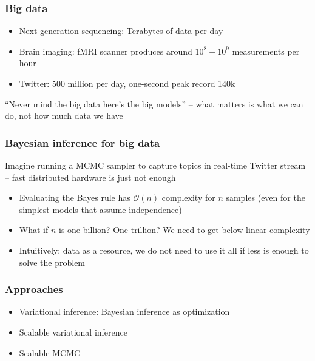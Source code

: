 \documentclass{beamer}
\begin{document}
\begin{frame}
  \frametitle{Big data}

  \begin{itemize}
    \item Next generation sequencing: Terabytes of data per day
    \item Brain imaging: fMRI scanner produces around $10^8-10^9$
      measurements per hour
    \item Twitter: 500 million per day, one-second peak record 140k
  \end{itemize}

  ``Never mind the big data here's the big models'' -- what matters
  is what we can do, not how much data we have

\end{frame}

\begin{frame}
  \frametitle{Bayesian inference for big data}

  Imagine running a MCMC sampler to capture topics in real-time
  Twitter stream -- fast distributed hardware is just not enough

  \begin{itemize}
  \item Evaluating the Bayes rule has $\mathcal{O}(n)$ complexity
    for $n$ samples (even for the simplest models that assume independence)
  \item What if $n$ is one billion? One trillion? We need to get below
    linear complexity
  \item Intuitively: data as a resource, we do not need to
    use it all if less is enough to solve the problem
  \end{itemize}
\end{frame}

\begin{frame}
  \frametitle{Approaches}

  \begin{itemize}
    \item Variational inference: Bayesian inference as optimization
    \item Scalable variational inference
    \item Scalable MCMC
  \end{itemize}
\end{frame}
\end{document}

